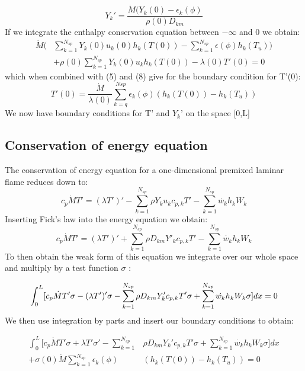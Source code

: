 \documentclass{article}
\begin{document}
  \begin{equation}
    Y_{k}' = \frac{\dot{M}(Y_{k}(0)-\epsilon_{k}(\phi)}{\rho(0)D_{km}}
  \end{equation}
  If we integrate the enthalpy conservation equation between $-\infty$ and 0 we obtain:
  \begin{align}
    \dot{M}\big(&\sum_{k=1}^{N_{sp}}Y_{k}(0)u_{k}(0)h_{k}(T(0))-\sum_{k=1}^{N_{sp}}\epsilon(\phi)h_{k}(T_{u})\big) \nonumber \\
    & +\rho(0)\sum_{k=1}^{N_{sp}}Y_{k}(0)u_{k}h_{k}(T(0))-\lambda (0)T'(0) = 0
  \end{align}
  which when combined with (5) and (8) give for the boundary condition for T'(0):
  \begin{equation}
    T'(0) = \frac{\dot{M}}{\lambda(0)}\sum_{k=q}^{N{sp}}\epsilon_{k}(\phi)(h_{k}(T(0))-h_{k}(T_{u}))
    \end{equation}
    We now have boundary conditions for T' and $Y_{k}$' on the space [0,L]






  \subsection{Conservation of energy equation}
The conservation of energy equation for a one-dimensional premixed laminar flame reduces down to:
\begin{equation}
  c_{p}\dot{M}T' = (\lambda T')'-\sum_{k=1}^{N_{sp}} \rho Y_{k}u_{k}c_{p,k}T'-\sum_{k=1}^{N_{sp}}\dot{w_{k}}h_{k}W_{k}
\end{equation}
   Inserting Fick's law into the energy equation we obtain:
  \begin{equation}
    c_{p}\dot{M}T' = (\lambda T')'+\sum_{k=1}^{N_{sp}} \rho D_{km} Y'_{k}c_{p,k}T'-\sum_{k=1}^{N_{sp}}\dot{w_{k}}h_{k}W_{k}
  \end{equation}
  To then obtain the weak form of this equation we integrate over our whole space and multiply by a test function $\sigma$ :
 
  \begin{equation}
   \int_{0}^{L}[c_{p}\dot{M}T'\sigma-(\lambda T')'\sigma-\sum_{k=1}^{N_{sp}} \rho D_{km}Y_{k}'c_{p,k}T'\sigma+\sum_{k=1}^{N_{sp}}\dot{w_{k}}h_{k}W_{k}\sigma] dx = 0 \\
  \end{equation}
  We then use integration by parts and insert our boundary conditions to obtain:
  
    \begin{align}
      \int_{0}^{L}[c_{p}\dot{M}T'\sigma+\lambda T'\sigma '-\sum_{k=1}^{N_{sp}}&\rho D_{km}Y_{k}'c_{p,k}T'\sigma+\sum_{k=1}^{N_{sp}}\dot{w_{k}}h_{k}W_{k}\sigma ]dx \nonumber \\
      + \sigma(0)\dot{M}\sum_{k=1}^{N_{sp}}\epsilon _{k}(\phi)&(h_{k}(T(0))-h_{k}(T_{u})) = 0
    \end{align}
\end{document}
